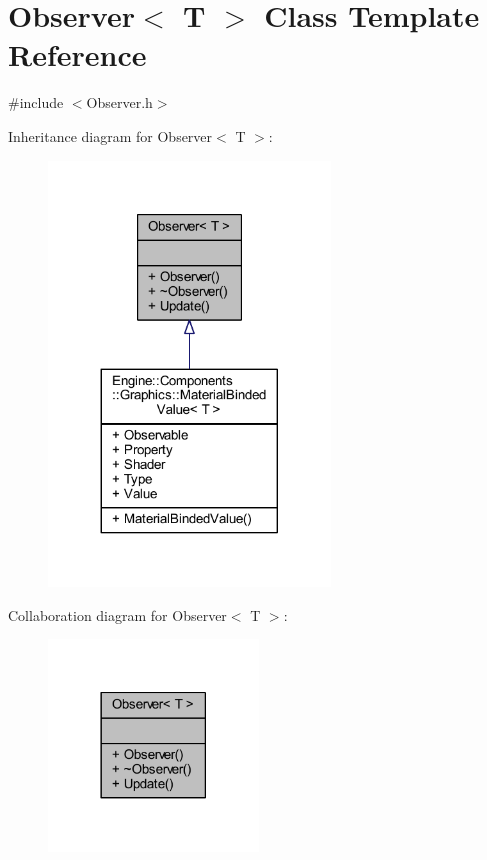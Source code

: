 \hypertarget{classObserver}{}\section{Observer$<$ T $>$ Class Template Reference}
\label{classObserver}


{\ttfamily \#include $<$Observer.\+h$>$}



Inheritance diagram for Observer$<$ T $>$\+:
\nopagebreak
\begin{figure}[H]
\begin{center}
\leavevmode
\includegraphics[width=212pt]{classObserver__inherit__graph}
\end{center}
\end{figure}


Collaboration diagram for Observer$<$ T $>$\+:
\nopagebreak
\begin{figure}[H]
\begin{center}
\leavevmode
\includegraphics[width=158pt]{classObserver__coll__graph}
\end{center}
\end{figure}
